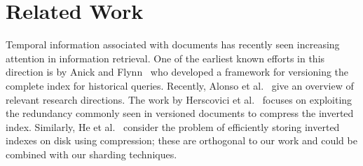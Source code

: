 


\section{Related Work}
\label{chap:sharding:sec:related}

Temporal information associated with documents has recently seen
increasing attention in information retrieval. One of the earliest
known efforts in this direction is by Anick and
Flynn~\cite{DBLP:conf/sigir/AnickF92} who developed a framework for
versioning the complete index for historical queries. Recently, Alonso
et al.~\cite{Alonso:2007aa} give an overview of relevant research
directions. The work by Herscovici et
al.~\cite{DBLP:conf/ecir/HerscoviciLY07} focuses on exploiting the
redundancy commonly seen in versioned documents to compress the
inverted index. Similarly, He et al.~\cite{DBLP:conf/cikm/HeYS09,DBLP:conf/cikm/HeZS10} consider the
problem of efficiently storing inverted indexes on disk using
compression; these are orthogonal to our work and could be combined
with our sharding techniques. 

